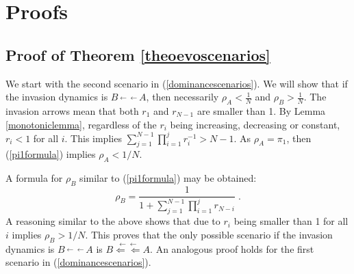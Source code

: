 \documentclass[12pt]{article}
\begin{document}
\appendix
\section{Proofs}
\label{appproofs}
\subsection{Proof of Theorem \ref{theoevoscenarios}}
\label{proofevoscenarios}

We start with the second scenario in (\ref{dominancescenarios}). We will show that if the invasion dynamics is $B\stackrel{\leftarrow \leftarrow}{} A$, then necessarily $ \rho_A<\frac{1}{N} $ and $ \rho_B>\frac{1}{N} $.  The invasion arrows mean that both $r_1$ and $r_{N-1}$ are smaller than 1. By Lemma \ref{monotoniclemma}, regardless of the $r_i$ being increasing, decreasing or constant, $r_i<1$ for all $i$. This implies $\sum_{j=1}^{N-1}\prod_{i=1}^{j}r_i^{-1}>N-1 $. As $\rho_A=\pi_1$, then (\ref{pi1formula}) implies $\rho_A <1/N$. 

A formula for $\rho_B$ similar to (\ref{pi1formula}) may be obtained: 
\begin{equation*}
\rho_B=\frac{1}{1+\sum_{j=1}^{N-1}\prod_{i=1}^{j}r_{N-i}}\;.
\end{equation*}  
A reasoning similar to the above shows that due to $r_i$ being smaller than 1 for all $i$ implies $\rho_B>1/N$. This proves that the only possible scenario if the invasion dynamics is $B\stackrel{\leftarrow \leftarrow}{} A$ is $B\stackrel{\leftarrow \leftarrow}{\Leftarrow \Leftarrow} A$. An analogous proof holds for the first scenario in (\ref{dominancescenarios}).
\end{document}
